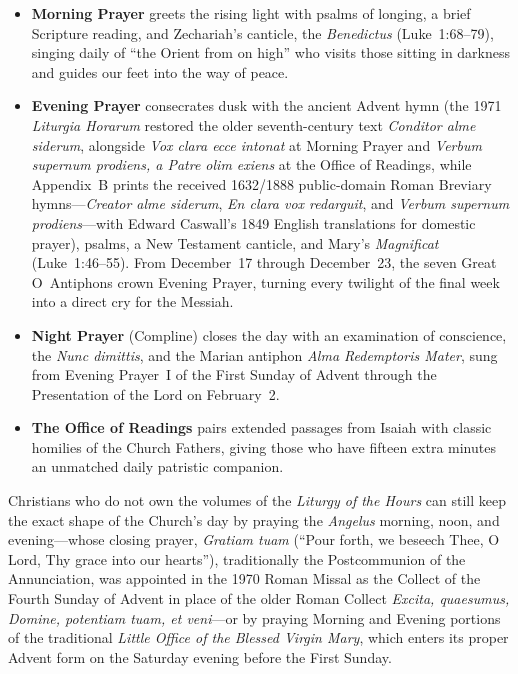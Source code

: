 \begin{itemize}
  \item \textbf{Morning Prayer} greets the rising light with psalms of longing, a brief Scripture reading, and Zechariah's canticle, the \textit{Benedictus} (Luke~1:68--79), singing daily of ``the Orient from on high'' who visits those sitting in darkness and guides our feet into the way of peace.
  \item \textbf{Evening Prayer} consecrates dusk with the ancient Advent hymn (the 1971 \textit{Liturgia Horarum} restored the older seventh-century text \textit{Conditor alme siderum}, alongside \textit{Vox clara ecce intonat} at Morning Prayer and \textit{Verbum supernum prodiens, a Patre olim exiens} at the Office of Readings, while Appendix~B prints the received 1632/1888 public-domain Roman Breviary hymns---\textit{Creator alme siderum}, \textit{En clara vox redarguit}, and \textit{Verbum supernum prodiens}---with Edward Caswall's 1849 English translations for domestic prayer), psalms, a New Testament canticle, and Mary's \textit{Magnificat} (Luke~1:46--55). From December~17 through December~23, the seven Great O~Antiphons crown Evening Prayer, turning every twilight of the final week into a direct cry for the Messiah.
  \item \textbf{Night Prayer} (Compline) closes the day with an examination of conscience, the \textit{Nunc dimittis}, and the Marian antiphon \textit{Alma Redemptoris Mater}, sung from Evening Prayer~I of the First Sunday of Advent through the Presentation of the Lord on February~2.
  \item \textbf{The Office of Readings} pairs extended passages from Isaiah with classic homilies of the Church Fathers, giving those who have fifteen extra minutes an unmatched daily patristic companion.
\end{itemize}

Christians who do not own the volumes of the \textit{Liturgy of the Hours} can still keep the exact shape of the Church's day by praying the \textit{Angelus} morning, noon, and evening---whose closing prayer, \textit{Gratiam tuam} (``Pour forth, we beseech Thee, O Lord, Thy grace into our hearts''), traditionally the Postcommunion of the Annunciation, was appointed in the 1970 Roman Missal as the Collect of the Fourth Sunday of Advent in place of the older Roman Collect \textit{Excita, quaesumus, Domine, potentiam tuam, et veni}---or by praying Morning and Evening portions of the traditional \textit{Little Office of the Blessed Virgin Mary}, which enters its proper Advent form on the Saturday evening before the First Sunday.

